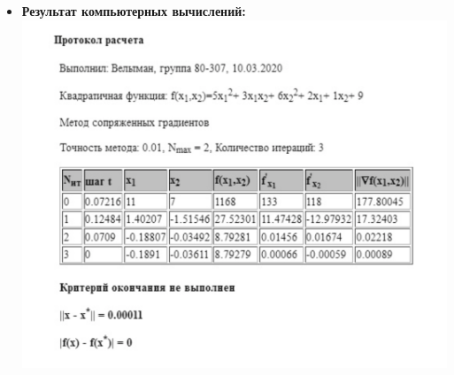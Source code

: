 \begin{itemize}
    
    {\it Найдем направление движения:} \\
    Определим начальное направление движения $dx^0 = -\nabla f(x^k) = (-133, -118)$. \\
    
    
    {\it Найдем длину шага:} \\
    Методом дихотомии с точностью $\epsilon$ на отрезке $[a, b]$ определили оптимальное значение как $t_k = t_0 = 0.0722$.\\

    
    {\it Вычислим следующую точку:} \\
    Найдем новое значение точки: \\
    $x^{k+1} = x^k + t_k \cdot dx^k = (11, 7) + 0.0722 \cdot (-133, -118) = (1.4021, -1.5155)$\\
    И увеличим значение $k = k + 1$ \\
    
    {\it Проверим критерий останова:}
    \begin{equation*}
    \|\nabla f(x^k)\| = \left\|\left(
    \begin{array}{cccc}
        11.4743\\
        -12.9793
    \end{array}
    \right)\right\| = \sqrt{(11.4743)^2 + (-12.9793)^2} = 17.3240 > 0.01 = \xi
    \end{equation*}
    $k = 1 < 5 = N_{max}$, значит критерий останова не выполнен.\\
    
    {\it Конец первой итерации.}
    
    \item {\bfseries Результат компьютерных вычислений:} \\
    \includegraphics[scale = 0.6]{img/4.PNG}
    
\end{itemize}

